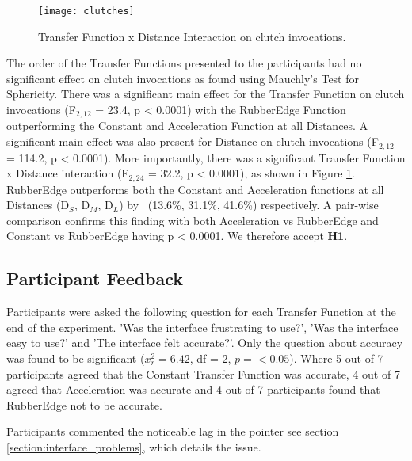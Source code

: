 \begin{figure}[h]
    \centering
    \texttt{[image: clutches]}
    \caption{Transfer Function x Distance Interaction on clutch invocations.}
    \label{fig:clutches}
\end{figure}

The order of the Transfer Functions presented to the participants had no significant effect on clutch invocations as found using Mauchly's Test for Sphericity. There was a significant main effect for the Transfer Function on clutch invocations (F$_{2,12}$ = 23.4, p < 0.0001) with the RubberEdge Function outperforming the Constant and Acceleration Function at all Distances. A significant main effect was also present for Distance on clutch invocations (F$_{2,12}$ = 114.2, p < 0.0001). More importantly, there was a significant Transfer Function x Distance interaction (F$_{2,24}$ = 32.2, p < 0.0001), as shown in Figure \ref{fig:clutches}. RubberEdge outperforms both the Constant and Acceleration functions at all Distances (D$_S$, D$_M$, D$_L$) by ~(13.6\%, 31.1\%, 41.6\%) respectively. A pair-wise comparison confirms this finding with both Acceleration vs RubberEdge and Constant vs RubberEdge having p < 0.0001. We therefore accept \textbf{H1}.


\subsection{Participant Feedback}
Participants were asked the following question for each Transfer Function at the end of the experiment. 'Was the interface frustrating to use?', 'Was the interface easy to use?' and 'The interface felt accurate?'. Only the question about accuracy was found to be significant ($x^2_r = 6.42$, df = 2, $p = < 0.05$). Where 5 out of 7 participants agreed that the Constant Transfer Function was accurate, 4 out of 7 agreed that Acceleration was accurate and 4 out of 7 participants found that RubberEdge not to be accurate.

Participants commented the noticeable lag in the pointer see section \ref{section:interface_problems}, which details the issue. 